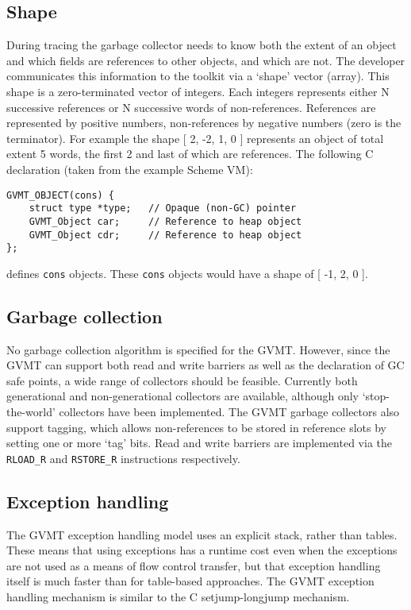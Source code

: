 \subsection{Shape\label{sect:shape}}
During tracing the garbage collector needs to know both the extent of an object and which fields are references to other objects, and which are not. The developer communicates this information to the toolkit via a `shape' vector (array).
This shape is a zero-terminated vector of integers. Each integers represents either N successive references or N successive words of non-references. References are represented by positive numbers, non-references by negative numbers (zero is the terminator).
For example the shape [ 2, -2, 1, 0 ] represents an object of total extent 5 words, the first 2 and last of which are references.
The following C declaration (taken from the example Scheme VM):
\begin{verbatim}
GVMT_OBJECT(cons) {   
    struct type *type;   // Opaque (non-GC) pointer
    GVMT_Object car;     // Reference to heap object
    GVMT_Object cdr;     // Reference to heap object
};
\end{verbatim}
defines \verb|cons| objects. These \verb|cons| objects would have a shape of [ -1, 2, 0 ].

\subsection{Garbage collection}
No garbage collection algorithm is specified for the GVMT. However, since the GVMT can support both read and write barriers as well as the declaration of GC safe points, a wide range of collectors should be feasible.
Currently both generational and non-generational collectors are available, although only `stop-the-world' collectors have been implemented. The GVMT garbage collectors also support tagging, which allows non-references to be stored in reference slots by setting one or more `tag' bits.
Read and write barriers are implemented via the \verb|RLOAD_R| and \verb|RSTORE_R| instructions respectively. 

\subsection{Exception handling}

The GVMT exception handling model uses an explicit stack, rather than tables. These means that using exceptions has a runtime cost even when the exceptions are not used as a means of flow control transfer, but that exception handling itself is much faster than for table-based approaches. The GVMT exception handling mechanism is similar to the C setjump-longjump mechanism.

